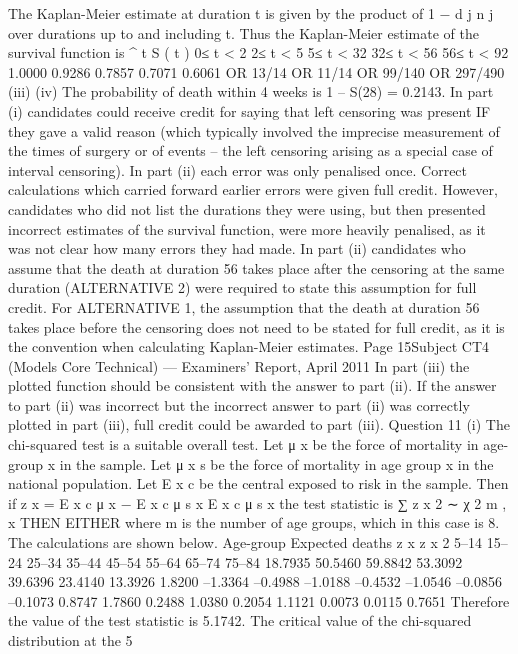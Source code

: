 \documentclass[a4paper,12pt]{article}
\begin{document}
\begin{enumerate}
The Kaplan-Meier estimate at duration t is given by the product of 1 −
d j
n j
over
durations up to and including t. Thus the Kaplan-Meier estimate of the survival
function is
^
t S ( t )
0≤ t < 2
2≤ t < 5
5≤ t < 32
32≤ t < 56
56≤ t < 92 1.0000
0.9286
0.7857
0.7071
0.6061
OR 13/14
OR 11/14
OR 99/140
OR 297/490
(iii)
(iv)
The probability of death within 4 weeks is 1 – S(28) = 0.2143.
In part (i) candidates could receive credit for saying that left censoring was present IF they gave a valid reason (which typically involved the imprecise measurement of the times of surgery or of events – the left censoring arising as a special case of interval censoring).
In part (ii) each error was only penalised once. Correct calculations which carried forward earlier errors were given full credit. However, candidates who did not list the durations they were using, but then presented incorrect estimates of the survival function, were more heavily penalised, as it was not clear how many errors they had made.
In part (ii) candidates who assume that the death at duration 56 takes place after the
censoring at the same duration (ALTERNATIVE 2) were required to state this assumption for full credit. For ALTERNATIVE 1, the assumption that the death at duration 56 takes place before the censoring does not need to be stated for full credit, as it is the convention when
calculating Kaplan-Meier estimates.
Page 15Subject CT4 (Models Core Technical) — Examiners’ Report, April 2011
In part (iii) the plotted function should be consistent with the answer to part (ii). If the answer to part (ii) was incorrect but the incorrect answer to part (ii) was correctly plotted in part (iii), full credit could be awarded to part (iii).
Question 11
(i)
The chi-squared test is a suitable overall test.
Let μ x be the force of mortality in age-group x in the sample.
Let μ x s be the force of mortality in age group x in the national population.
Let E x c be the central exposed to risk in the sample.
Then if z x =
E x c μ x − E x c μ s x
E x c μ s x
the test statistic is
∑ z x 2 ∼ χ 2 m ,
x
THEN EITHER
where m is the number of age groups, which in this case is 8.
The calculations are shown below.
Age-group Expected deaths z x z x 2
5–14
15–24
25–34
35–44
45–54
55–64
65–74
75–84 18.7935
50.5460
59.8842
53.3092
39.6396
23.4140
13.3926
1.8200 –1.3364
–0.4988
–1.0188
–0.4532
–1.0546
–0.0856
–0.1073
0.8747 1.7860
0.2488
1.0380
0.2054
1.1121
0.0073
0.0115
0.7651
Therefore the value of the test statistic is 5.1742.
The critical value of the chi-squared distribution at the 5%

\end{enumerate}
\end{document}
